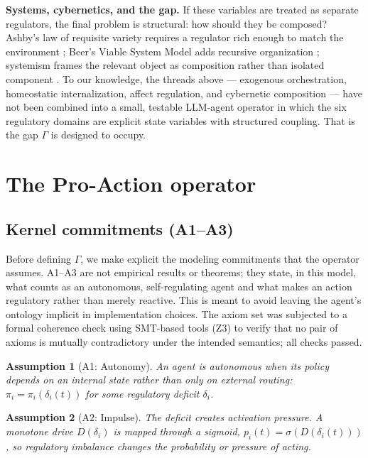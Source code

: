 \documentclass{article}
\newtheorem{assumption}{Assumption}[section]
\begin{document}
\textbf{Systems, cybernetics, and the gap.} If these variables are treated as separate regulators, the final problem is structural: how should they be composed? Ashby's law of requisite variety requires a regulator rich enough to match the environment \citep{ashby1956introduction}; Beer's Viable System Model adds recursive organization \citep{beer1972brain}; systemism frames the relevant object as composition rather than isolated component \citep{bunge2003emergence,romero2018scientific}. To our knowledge, the threads above --- exogenous orchestration, homeostatic internalization, affect regulation, and cybernetic composition --- have not been combined into a small, testable LLM-agent operator in which the six regulatory domains are explicit state variables with structured coupling. That is the gap $\Gamma$ is designed to occupy.

\section{The Pro-Action operator}

\subsection{Kernel commitments (A1--A3)}

Before defining $\Gamma$, we make explicit the modeling commitments that the operator assumes. A1--A3 are not empirical results or theorems; they state, in this model, what counts as an autonomous, self-regulating agent and what makes an action regulatory rather than merely reactive. This is meant to avoid leaving the agent's ontology implicit in implementation choices. The axiom set was subjected to a formal coherence check using SMT-based tools (Z3) to verify that no pair of axioms is mutually contradictory under the intended semantics; all checks passed.

\begin{assumption}[A1: Autonomy]
An agent is autonomous when its policy depends on an internal state rather than only on external routing: $\pi_i = \pi_i(\delta_i(t))$ for some regulatory deficit $\delta_i$.
\end{assumption}

\begin{assumption}[A2: Impulse]
The deficit creates activation pressure. A monotone drive $D(\delta_i)$ is mapped through a sigmoid, $p_i(t)=\sigma(D(\delta_i(t)))$, so regulatory imbalance changes the probability or pressure of acting.
\end{assumption}
\end{document}
